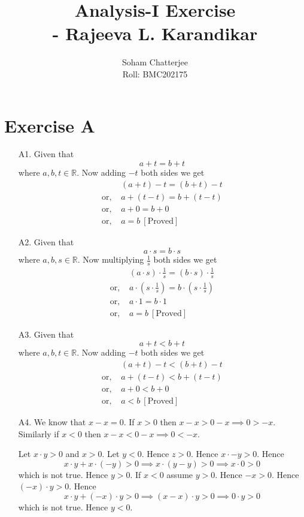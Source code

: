 \documentclass{article}
\title{\huge{Analysis-I Exercise\\ \hspace{5cm}- Rajeeva L. Karandikar}}
\author{Soham Chatterjee\\Roll: BMC202175}
\date{}
\begin{document}
	\maketitle
	\pagebreak
	\section{Exercise A}
	\begin{enumerate}
		\item[A1.] Given that $$a+t=b+t$$where $a,b,t\in\mathbb{R}$. Now adding $-t$ both sides we get
		\begin{align*}
			& (a+t)-t=(b+t)-t\\
			\text{or, } & a+(t-t)=b+(t-t)\\
			\text{or, } & a+0=b+0\\
			\text{or, } & a=b\ [\text{Proved}]
		\end{align*}
		\item[A2.]  Given that $$a\cdot s=b\cdot s$$where $a,b,s\in\mathbb{R}$. Now multiplying $\frac1s$ both sides we get
		\begin{align*}
			& (a\cdot s)\cdot \frac1s=(b\cdot s)\cdot \frac1s\\
			\text{or, } & a\cdot (s\cdot \frac1s)=b\cdot (s\cdot \frac1s)\\
			\text{or, } & a\cdot 1=b\cdot 1\\
			\text{or, } & a=b\ [\text{Proved}]
		\end{align*}
		\item[A3.] Given that $$a+t<b+t$$where $a,b,t\in\mathbb{R}$. Now adding $-t$ both sides we get
		\begin{align*}
			& (a+t)-t<(b+t)-t\\
			\text{or, } & a+(t-t)<b+(t-t)\\
			\text{or, } & a+0<b+0\\
			\text{or, } & a<b\ [\text{Proved}]
		\end{align*}
		\item[A4.] We know that $x-x=0$. If $x>0$ then $x-x>0-x\implies 0>-x$. Similarly if  $x<0$ then   $x-x<0-x\implies 0<-x$.
		
		\hspace{1cm}Let $x\cdot y>0$ and $x>0$. Let $y<0$. Hence $z>0$. Hence $x\cdot -y>0$. Hence $$x\cdot y+x\cdot (-y)>0 \implies x\cdot(y-y)>0\implies x\cdot 0>0$$ which is not true. Hence $y>0$. If $x<0$ assume $y>0$. Hence $-x>0$.  Hence $(-x)\cdot y>0$. Hence $$x\cdot y+(-x)\cdot y>0 \implies (x-x)\cdot y>0\implies 0\cdot y>0$$ which is not true. Hence $y<0$.
		

\end{enumerate}
\end{document}
